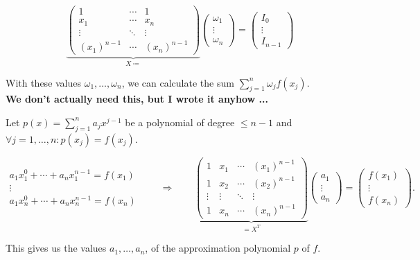 \documentclass{article}
\begin{document}
\begin{itemize}
    \begin{equation*}
        \underbrace{
        \begin{pmatrix}
            1           &   \cdots  &   1           \\
            x_1         &   \cdots  &   x_n         \\
            \vdots      &   \ddots  &   \vdots      \\
            (x_1)^{n-1} &   \cdots  &   (x_n)^{n-1}
        \end{pmatrix}
        }_{X \coloneqq}
        \begin{pmatrix}
            \omega_1    \\
            \vdots      \\
            \omega_n
        \end{pmatrix}
        =
        \begin{pmatrix}
            I_0     \\
            \vdots  \\
            I_{n-1}
        \end{pmatrix}
    \end{equation*}
    
    With these values $\omega_1, \ldots, \omega_n$, we can calculate the sum $\sum_{j = 1}^n \omega_j f(x_j)$. \\
    
    \textbf{We don't actually need this, but I wrote it anyhow ...}
    
    Let $p(x) = \sum_{j = 1}^n a_j x^{j - 1}$ be a polynomial of degree $\leq n - 1$ and $\forall j = 1, \ldots, n: p(x_j) = f(x_j)$.
    
    \begin{equation*}
        \begin{matrix}
            a_1 x_1^0 + \cdots + a_n x_1^{n-1} = f(x_1) \\
            \vdots \\
            a_1 x_n^0 + \cdots + a_n x_n^{n-1} = f(x_n)
    \end{matrix}
    \qquad \Rightarrow \qquad
    \underbrace{
    \begin{pmatrix}
        1       &   x_1     &   \cdots  &   (x_1)^{n-1} \\
        1       &   x_2     &   \cdots  &   (x_2)^{n-1} \\
        \vdots  &   \vdots  &   \ddots  &   \vdots      \\
        1       &   x_n     &   \cdots  &   (x_n)^{n-1}
    \end{pmatrix}
    }_{= X^T}
    \begin{pmatrix}
        a_1     \\
        \vdots  \\
        a_n
    \end{pmatrix}
    =
    \begin{pmatrix}
        f(x_1)  \\
        \vdots  \\
        f(x_n)
    \end{pmatrix}
    \text{.}
    \end{equation*}
    
    This gives us the values $a_1, \ldots, a_n$, of the approximation polynomial $p$ of $f$.
\end{itemize}
\end{document}
